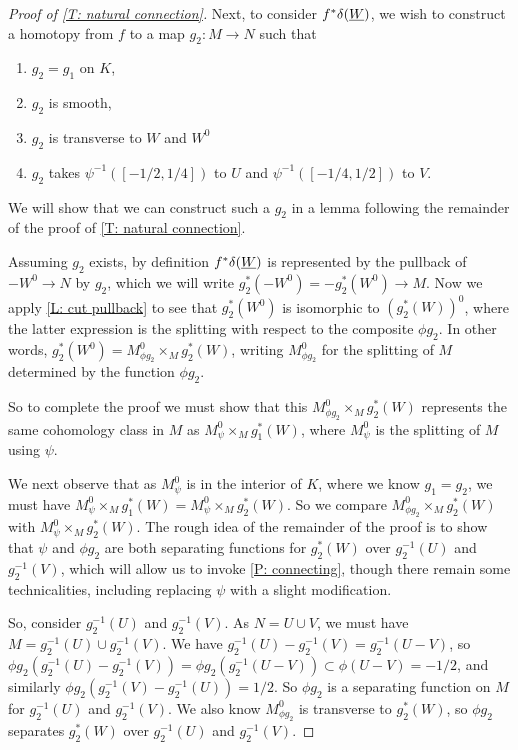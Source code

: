 \begin{proof}[Proof of \cref{T: natural connection}]
	Next, to consider $f^* \delta (\underline{W})$, we wish to construct a homotopy from $f$ to a map $g_2 \colon M \to N$ such that
	\begin{enumerate}
		\item $g_2 = g_1$ on $K$,
		\item $g_2$ is smooth,
		\item $g_2$ is transverse to $W$ and $W^0$
		\item $g_2$ takes $\psi^{-1}([-1/2,1/4])$ to $U$ and $\psi^{-1}([-1/4,1/2])$ to $V$.
	\end{enumerate}
	We will show that we can construct such a $g_2$ in a lemma following the remainder of the proof of \cref{T: natural connection}.

	Assuming $g_2$ exists, by definition $f^* \delta (\underline{W})$ is represented by the pullback of $-W^0 \to N$ by $g_2$, which we will write $g_2^*(-W^0) = - g_2^*(W^0) \to M$.
	Now we apply \cref{L: cut pullback} to see that $g_2^*(W^0)$ is isomorphic to $(g_2^*(W))^0$, where the latter expression is the splitting with respect to the composite $\phi g_2$.
	In other words, $g_2^*(W^0) = M^0_{\phi g_2} \times_M g_2^*(W)$, writing $M^0_{\phi g_2}$ for the splitting of $M$ determined by the function $\phi g_2$.

	So to complete the proof we must show that this $M^0_{\phi g_2} \times_M g_2^*(W)$ represents the same cohomology class in $M$ as $M^0_\psi \times_M g_1^*(W)$, where $M^0_\psi$ is the splitting of $M$ using $\psi$.

	We next observe that as $M^0_\psi$ is in the interior of $K$, where we know $g_1 = g_2$, we must have $M^0_\psi \times_M g_1^*(W) = M^0_\psi \times_M g_2^*(W)$.
	So we compare $M^0_{\phi g_2} \times_M g_2^*(W)$ with $M^0_\psi \times_M g_2^*(W)$.
	The rough idea of the remainder of the proof is to show that $\psi$ and $\phi g_2$ are both separating functions for $g_2^*(W)$ over $g_2^{-1}(U)$ and $g_2^{-1}(V)$, which will allow us to invoke \cref{P: connecting}, though there remain some technicalities, including replacing $\psi$ with a slight modification.

	So, consider $g_2^{-1}(U)$ and $g_2^{-1}(V)$. As $N = U \cup V$, we must have $M = g_2^{-1}(U) \cup g_2^{-1}(V)$.
	We have $g_2^{-1}(U) - g_2^{-1}(V) = g_2^{-1}(U  - V)$, so $\phi g_2(g_2^{-1}(U) - g_2^{-1}(V)) = \phi g_2(g_2^{-1}(U  - V)) \subset \phi(U  - V) = -1/2$, and similarly $\phi g_2(g_2^{-1}(V)  - g_2^{-1}(U)) = 1/2$.
	So $\phi g_2$ is a separating function on $M$ for $g_2^{-1}(U)$ and $g_2^{-1}(V)$.
	We also know $M^0_{\phi g_2}$ is transverse to $g_2^*(W)$, so $\phi g_2$ separates $g_2^*(W)$ over $g_2^{-1}(U)$ and $g_2^{-1}(V)$.


\end{proof}
